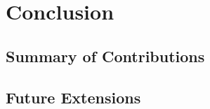 \chapter{Conclusion} \label{chapter:conclusion}
\section{Summary of Contributions}
\section{Future Extensions} %